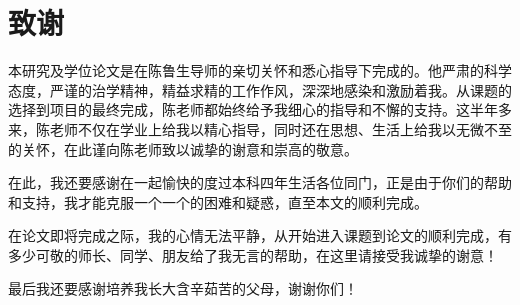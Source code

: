 
\chapter*{致谢}
本研究及学位论文是在陈鲁生导师的亲切关怀和悉心指导下完成的。他严肃的科学态度，严谨的治学精神，精益求精的工作作风，深深地感染和激励着我。从课题的选择到项目的最终完成，陈老师都始终给予我细心的指导和不懈的支持。这半年多来，陈老师不仅在学业上给我以精心指导，同时还在思想、生活上给我以无微不至的关怀，在此谨向陈老师致以诚挚的谢意和崇高的敬意。

在此，我还要感谢在一起愉快的度过本科四年生活各位同门，正是由于你们的帮助和支持，我才能克服一个一个的困难和疑惑，直至本文的顺利完成。

在论文即将完成之际，我的心情无法平静，从开始进入课题到论文的顺利完成，有多少可敬的师长、同学、朋友给了我无言的帮助，在这里请接受我诚挚的谢意！

最后我还要感谢培养我长大含辛茹苦的父母，谢谢你们！
